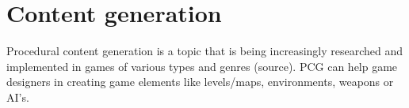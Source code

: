 \documentclass[a4paper,titlepage,final, twoside]{report}
\begin{document}




\section{Content generation}
Procedural content generation is a topic that is being increasingly researched and implemented in games of various types and genres (source). PCG can help game designers in creating game elements like levels/maps, environments, weapons or AI's.
\end{document}
